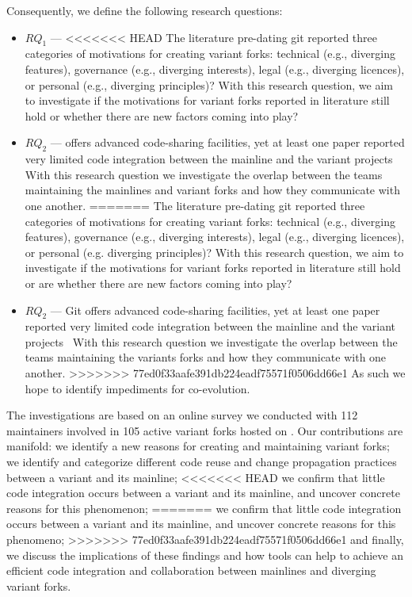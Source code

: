\noindent
Consequently, we define the following research questions:
\begin{itemize}
\item $RQ_1$ --- \textit{\RQOne}
<<<<<<< HEAD
The literature pre-dating git reported three categories of motivations for creating variant forks: technical (e.g., diverging features), governance (e.g., diverging interests), legal (e.g., diverging licences), or personal (e.g., diverging principles)?
With this research question, we aim to investigate if the motivations for variant forks reported in literature still hold or whether there are new factors coming into play?

\item $RQ_2$ --- \textit{\RQTwo}
\git offers advanced code-sharing facilities, yet at least one paper reported very limited code integration between the mainline and the variant projects~\cite{businge:emse:2021}
With this research question we investigate the overlap between the teams maintaining the mainlines and variant forks and how they communicate with one another.
=======
The literature pre-dating git reported three categories of motivations for creating variant forks: technical (e.g., diverging features), governance (e.g., diverging interests), legal (e.g., diverging licences), or personal (e.g. diverging principles)?
With this research question, we aim to investigate if the motivations for variant forks reported in literature still hold or are whether there are new factors coming into play? 

\item $RQ_2$ --- \textit{\RQTwo}
Git offers advanced code-sharing facilities, yet at least one paper reported very limited code integration between the mainline and the variant projects~\cite{businge:emse:2021}
With this research question we investigate the overlap between the teams maintaining the variants forks and how they communicate with one another.
>>>>>>> 77ed0f33aafe391db224eadf75571f0506dd66e1
As such we hope to identify impediments for co-evolution.
\end{itemize}


The investigations are based on an online survey we conducted with 112 maintainers involved in 105 active variant forks hosted on \gh.
%
Our contributions are manifold:
we identify a new reasons for creating and maintaining variant forks;
we identify and categorize different code reuse and change propagation practices between a variant and its mainline;
<<<<<<< HEAD
we confirm that little code integration occurs between a variant and its mainline, and uncover concrete reasons for this phenomenon;
=======
we confirm that little code integration occurs between a variant and its mainline, and uncover concrete reasons for this phenomeno;
>>>>>>> 77ed0f33aafe391db224eadf75571f0506dd66e1
and finally, we discuss the implications of these findings and how tools can help to achieve an efficient code integration and collaboration between mainlines and diverging variant forks.

